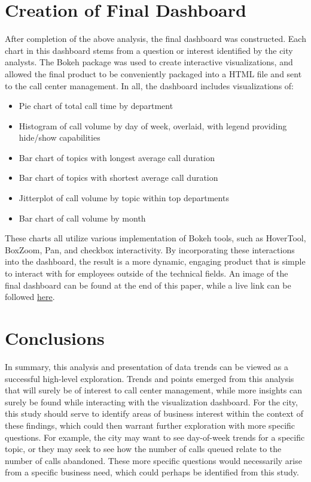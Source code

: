 \documentclass[11pt,twocolumn]{article}
\begin{document}
\section{Creation of Final Dashboard}
After completion of the above analysis, the final dashboard was constructed.  Each chart in this dashboard stems from a question or interest identified by the city analysts.  The Bokeh package was used to create interactive visualizations, and allowed the final product to be conveniently packaged into a HTML file and sent to the call center management.  In all, the dashboard includes visualizations of:

\begin{itemize}
  \item{Pie chart of total call time by department}
  \item{Histogram of call volume by day of week, overlaid, with legend providing hide/show capabilities}
  \item{Bar chart of topics with longest average call duration}
  \item{Bar chart of topics with shortest average call duration}
  \item{Jitterplot of call volume by topic within top departments}
  \item{Bar chart of call volume by month}
\end{itemize}

These charts all utilize various implementation of Bokeh tools, such as HoverTool, BoxZoom, Pan, and checkbox interactivity.  By incorporating these interactions into the dashboard, the result is a more dynamic, engaging product that is simple to interact with for employees outside of the technical fields.  An image of the final dashboard can be found at the end of this paper, while a live link can be followed \href{https://github.com/jdbul33/verbose-chainsaw/blob/master/South_Bend_311/311_Call_Center_Dashboard.html}{here}.

\section{Conclusions}

In summary, this analysis and presentation of data trends can be viewed as a successful high-level exploration.  Trends and points emerged from this analysis that will surely be of interest to call center management, while more insights can surely be found while interacting with the visualization dashboard.  For the city, this study should serve to identify areas of business interest within the context of these findings, which could then warrant further exploration with more specific questions.  For example, the city may want to see day-of-week trends for a specific topic, or they may seek to see how the number of calls queued relate to the number of calls abandoned.  These more specific questions would necessarily arise from a specific business need, which could perhaps be identified from this study.
\end{document}
